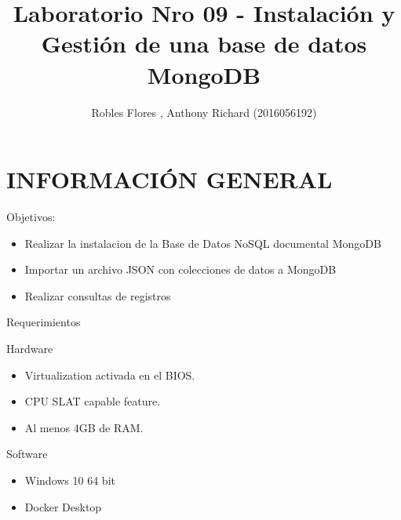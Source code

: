 \documentclass[preprint,12pt]{elsarticle}
\begin{document}
	\begin{frontmatter}
		\title{\huge Laboratorio Nro 09 -  Instalación y Gestión de una base de datos MongoDB}
		\address{Universidad Privada de Tacna}
		\address{Escuela Profesional de Ingeniería de Sistemas}
		\address{Base de DAtos II}		
		\author{Robles Flores , Anthony Richard             	(2016056192)}		
		\address{Tacna, Perú}
\end{frontmatter}

\section{INFORMACIÓN GENERAL}
Objetivos:
\begin{itemize}
\item Realizar la instalacion de la Base de Datos NoSQL documental MongoDB
\item Importar un archivo JSON con colecciones de datos a MongoDB
\item Realizar consultas de registros
\end{itemize}

Requerimientos

Hardware
\begin{itemize}
\item Virtualization activada en el BIOS.
\item CPU SLAT capable feature.
\item Al menos 4GB de RAM.
\end{itemize}

Software
\begin{itemize}
\item Windows 10 64 bit
\item Docker Desktop
\end{itemize}

\end{document}
